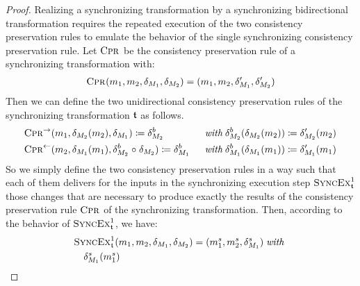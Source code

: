 \begin{proof}
    Realizing a synchronizing transformation by a synchronizing bidirectional transformation requires the repeated execution of the two consistency preservation rules to emulate the behavior of the single 
    synchronizing consistency preservation rule.
    Let $\textsc{Cpr}_{}$ be the consistency preservation rule of a synchronizing transformation with:
    \begin{align*}
        \consistencypreservationrule{}(\model{m}{1},\model{m}{2},\change{\metamodel{M}{1}},\change{\metamodel{M}{2}}) = (\model{m}{1},\model{m}{2},\change{\metamodel{M}{1}}',\change{\metamodel{M}{2}}')
    \end{align*}
    Then we can define the two unidirectional consistency preservation rules of the synchronizing transformation $\transformation{t}$ as follows.
    \begin{alignat*}{2}
        & 
        \consistencypreservationrule{}^{\rightarrow}(\model{m}{1},\change{\metamodel{M}{2}}(\model{m}{2}),\change{\metamodel{M}{1}}) \equalsperdefinition \change{\metamodel{M}{2}}^{b} 
        &&
        \withmath \change{\metamodel{M}{2}}^{b}(\change{\metamodel{M}{2}}(\model{m}{2})) \equalsperdefinition \change{\metamodel{M}{2}}'(\model{m}{2}) \\
        &
        \consistencypreservationrule{}^{\leftarrow}(\model{m}{2},\change{\metamodel{M}{1}}(\model{m}{1}),\change{\metamodel{M}{2}}^{b} \concatfunction \change{\metamodel{M}{2}}) \equalsperdefinition \change{\metamodel{M}{1}}^{b} \; 
        &&
        \withmath \change{\metamodel{M}{1}}^{b}(\change{\metamodel{M}{1}}(\model{m}{1})) \equalsperdefinition \change{\metamodel{M}{1}}'(\model{m}{1})
    \end{alignat*}
    So we simply define the two consistency preservation rules in a way such that each of them delivers for the inputs in the synchronizing execution step $\function{SyncEx}_{\transformation{t}}^1$ those changes that are necessary to produce exactly the results of the consistency preservation rule $\textsc{Cpr}_{}$ of the synchronizing transformation.
    Then, according to the behavior of $\function{SyncEx}_{\transformation{t}}^1$, we have:
    \begin{align*}
        &
        \function{SyncEx}_{\transformation{t}}^1(\model{m}{1},\model{m}{2},\change{\metamodel{M}{1}},\change{\metamodel{M}{2}}) = (\model{m}{1}^{s}, \model{m}{2}^{s}, \change{\metamodel{M}{1}}^{s}) \withmath \\
        & \formulaskip
        \change{\metamodel{M}{1}}^{s}(\model{m}{1}^{s}) %

\end{align*}
\end{proof}

